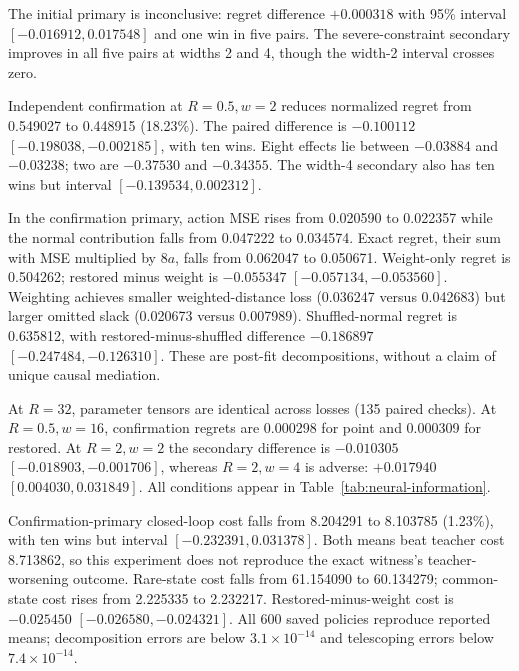 The initial primary is inconclusive: regret difference $+0.000318$
with 95\% interval $[-0.016912,0.017548]$ and one win in five pairs.
The severe-constraint secondary improves in all five pairs at widths
2 and 4, though the width-2 interval crosses zero.

Independent confirmation at $R=0.5,w=2$ reduces normalized regret from
0.549027 to 0.448915 (18.23\%). The paired difference is $-0.100112$
$[-0.198038,-0.002185]$, with ten wins. Eight effects lie between
$-0.03884$ and $-0.03238$; two are $-0.37530$ and $-0.34355$.
The width-4 secondary also has ten wins but interval
$[-0.139534,0.002312]$.

In the confirmation primary, action MSE rises from 0.020590 to
0.022357 while the normal contribution falls from 0.047222 to
0.034574. Exact regret, their sum with MSE multiplied by $8a$, falls
from 0.062047 to 0.050671. Weight-only regret is 0.504262; restored
minus weight is $-0.055347$ $[-0.057134,-0.053560]$. Weighting achieves
smaller weighted-distance loss (0.036247 versus 0.042683) but larger
omitted slack (0.020673 versus 0.007989). Shuffled-normal regret is
0.635812, with restored-minus-shuffled difference $-0.186897$
$[-0.247484,-0.126310]$. These are post-fit decompositions, without a
claim of unique causal mediation.

At $R=32$, parameter tensors are identical across losses (135 paired
checks). At $R=0.5,w=16$, confirmation regrets are 0.000298 for point
and 0.000309 for restored. At $R=2,w=2$ the secondary difference is
$-0.010305$ $[-0.018903,-0.001706]$, whereas $R=2,w=4$ is adverse:
$+0.017940$ $[0.004030,0.031849]$. All conditions appear in
Table~\ref{tab:neural-information}.

Confirmation-primary closed-loop cost falls from 8.204291 to 8.103785
(1.23\%), with ten wins but interval $[-0.232391,0.031378]$. Both
means beat teacher cost 8.713862, so this experiment does not reproduce
the exact witness's teacher-worsening outcome. Rare-state cost falls
from 61.154090 to 60.134279; common-state cost rises from 2.225335
to 2.232217. Restored-minus-weight cost is $-0.025450$
$[-0.026580,-0.024321]$. All 600 saved policies reproduce reported
means; decomposition errors are below $3.1\times10^{-14}$ and
telescoping errors below $7.4\times10^{-14}$.
